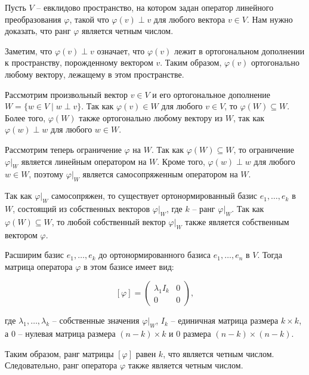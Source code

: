 Пусть $V$ -- евклидово пространство, на котором задан оператор линейного преобразования $\varphi$, такой что $\varphi(v) \perp v$ для
любого вектора $v \in V$.
Нам нужно доказать, что ранг $\varphi$ является четным числом.

Заметим, что $\varphi(v) \perp v$ означает, что $\varphi(v)$ лежит в ортогональном дополнении к пространству, порожденному вектором $v$.
Таким образом, $\varphi(v)$ ортогонально любому вектору, лежащему в этом пространстве.

Рассмотрим произвольный вектор $v \in V$ и его ортогональное дополнение $W = \{w \in V \mid w \perp v\}$.
Так как $\varphi(v) \in W$ для любого $v \in V$, то $\varphi(W) \subseteq W$.
Более того, $\varphi(W)$ также ортогонально любому вектору из $W$, так как $\varphi(w) \perp w$ для любого $w \in W$.

Рассмотрим теперь ограничение $\varphi$ на $W$.
Так как $\varphi(W) \subseteq W$, то ограничение $\varphi|_W$ является линейным оператором на $W$.
Кроме того, $\varphi(w) \perp w$ для любого $w \in W$, поэтому $\varphi|_W$ является самосопряженным оператором на $W$.

Так как $\varphi|_W$ самосопряжен, то существует ортонормированный базис $e_1, \dots, e_k$ в $W$, состоящий из
собственных векторов $\varphi|_W$, где $k$ -- ранг $\varphi|_W$.
Так как $\varphi(W) \subseteq W$, то любой собственный вектор $\varphi|_W$ также является собственным вектором $\varphi$.

Расширим базис $e_1, \dots, e_k$ до ортонормированного базиса $e_1, \dots, e_n$ в $V$.
Тогда матрица оператора $\varphi$ в этом базисе имеет вид:

\[ [\varphi] =
\begin{pmatrix}
    \lambda_1 I_k & 0 \\
    0             & 0
\end{pmatrix}, \]

где $\lambda_1, \dots, \lambda_k$ -- собственные значения $\varphi|_W$, $I_k$ -- единичная матрица размера $k \times
k$, а $0$ -- нулевая матрица размера $(n-k) \times k$ и $0$ размера $(n-k) \times (n-k)$.

Таким образом, ранг матрицы $[\varphi]$ равен $k$, что является четным числом.
Следовательно, ранг оператора $\varphi$ также является четным числом.